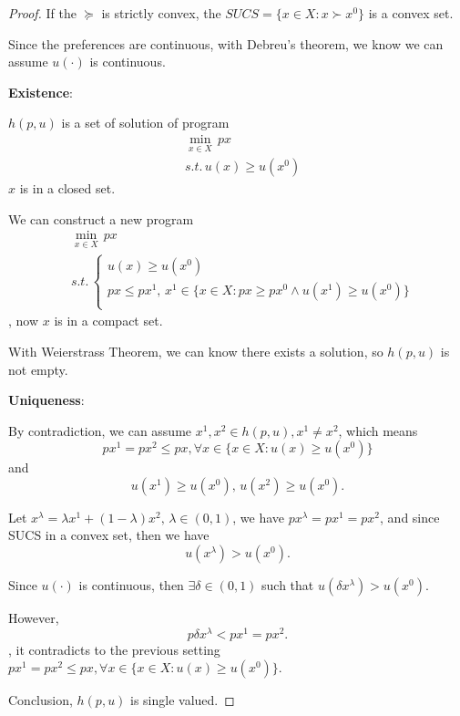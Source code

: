 \documentclass[letterpaper, 11pt]{article}
\newcommand{\1}{\mathds{1}}	%
\theoremstyle{definition}
\begin{document}
\begin{proof}
    If the $\succeq $ is strictly convex, the $SUCS = \{x \in X: x \succ x^0\}$ is a convex set.

    Since the preferences are continuous, with Debreu's theorem, we know we can assume $u(\cdot )$ is continuous.

    \textbf{Existence}:

    $h(p,u)$ is a set of solution of program \begin{align*}
         & \min_{x \in X} \, px              \\
         & s.t.\, u(x) \geq u(x^0)
    \end{align*} $x$ is in a closed set.

    We can construct a new program \begin{align*}
         & \min_{x \in X} \, px              \\
         & s.t.\, \left\{\begin{array}{l}
             u(x) \geq u(x^0) \\
            p x \leq px^1, \, x^1 \in \{x \in X: px \geq px^0 \wedge u(x^1) \geq u(x^0)\} \\
         \end{array}\right.
    \end{align*}, now $x$ is in a compact set.

    With Weierstrass Theorem, we can know there exists a solution, so $h(p,u)$ is not empty.

    \textbf{Uniqueness}:

    By contradiction, we can assume $x^1, x^2 \in h(p,u), x^1 \neq x^2$, which means \[
        p x^1 = p x^2 \leq px,  \forall x \in \{x \in X: u(x) \geq u(x^0)\}
    \]
    and \[
        u(x^1) \geq u(x^0), \, u(x^2) \geq u(x^0).
    \]

    Let $x^\lambda = \lambda x^1 + (1-\lambda)x^2, \, \lambda \in (0,1)$, we have $px^\lambda = px^1 = px^2$, and since SUCS in a convex set, then we have \[
        u(x^\lambda) > u(x^0).
    \]

    Since $u(\cdot )$ is continuous, then $\exists \delta \in (0,1)$ such that $u(\delta x^\lambda) > u(x^0)$.

    However, \[
        p\delta x^\lambda < px^1 = px^2.
    \], it contradicts to the previous setting $p x^1 = p x^2 \leq px,  \forall x \in \{x \in X: u(x) \geq u(x^0)\}$.


    Conclusion, $h(p, u)$ is single valued.

\end{proof}


\end{document}
